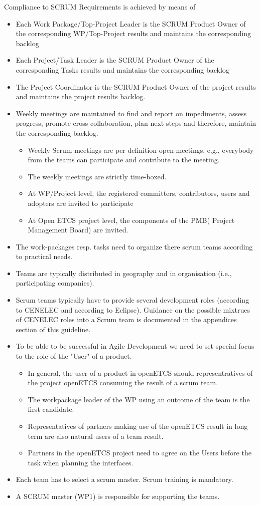 \documentclass{template/openetcs_article}
\begin{document}
Compliance to SCRUM Requirements is achieved by means of
\begin{itemize}
\item Each Work Package/Top-Project Leader is the SCRUM Product Owner of the corresponding \gls{WP}/Top-Project results and maintains the corresponding backlog
\item Each Project/Task Leader is the SCRUM  Product Owner of the corresponding Tasks results  and maintains the corresponding backlog
\item The Project Coordinator is the SCRUM Product Owner of the project results and maintains the project results backlog.
\item Weekly meetings are maintained to find and report on impediments, assess progress, promote cross-collaboration, plan next steps and therefore, maintain the corresponding backlog.
\begin{itemize}
\item Weekly Scrum meetings are per definition open meetings, e.g., everybody from the teams can participate and contribute to the meeting.
\item The weekly meetings are strictly time-boxed.
\item At \gls{WP}/Project level, the registered committers, contributors, users and adopters are invited to participate
\item At Open \gls{ETCS} project level, the components of the PMB( Project Management Board) are invited.
\end{itemize} 
\item The work-packages resp. tasks need to organize there scrum teams according to practical needs.
\item Teams are typically distributed in geography and in organisation (i.e., participating companies).
\item Scrum teams typically have to provide several development roles (according to CENELEC and according to Eclipse). Guidance on the possible mixtrues of CENELEC roles into a Scrum team is documented in the appendices section of this guideline.
\item To be able to be successful in Agile Development we need to set special focus to the role of the "User" of a product.
\begin{itemize}
\item In general, the user of a product in openETCS should representratives of the project openETCS consuming the result of a scrum team. 
\item The workpackage leader of the \gls{WP} using an outcome of the team is the first candidate.
\item Representatives of partners making use of the openETCS result in long term are also natural users of a team result.
\item Partners in the openETCS project need to agree on the Users before the task when planning the interfaces. 
\end{itemize}  
\item Each team has to select a scrum master. Scrum training is mandatory.
\item A SCRUM master (WP1) is responsible for supporting the teams.
\end{itemize}
\end{document}
